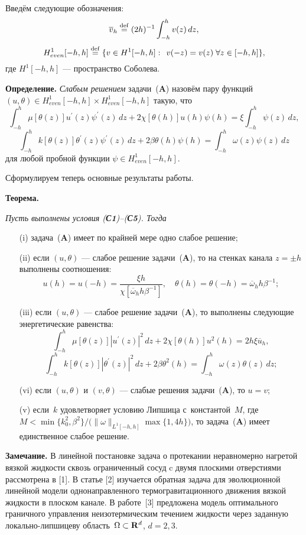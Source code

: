 Введём следующие обозначения:
$$
\overline{v}_h\stackrel{{\rm def}}{=}(2h)^{-1}\int_{-h}^hv(z)\,dz,
$$
$$
H^1_{ even}[-h,h]\stackrel{{\rm def}}{=}\{v\in H^1[-h,h]:\;\, v(-z)=v(z)\; \forall z\in [-h,h]\},
$$
где $H^1[-h,h]$ --- пространство Соболева.

\medskip
{\bf Определение.} {\it Слабым решением} задачи~({\bf A}) назовём пару функций ${(u, \theta)\in H^1_{even}[-h,h]\times H^1_{even}[-h,h]}$ такую, что
$$
\int_{-h}^h\mu[\theta(z)]u^\prime(z) \psi^\prime(z)\,dz
+2\chi[\theta(h)]u(h)\psi(h)
=\xi\int_{-h}^h \psi(z)\,dz,
$$
$$
\int_{-h}^hk[\theta(z)]\theta^\prime(z) \psi^\prime(z)\,dz
+2\beta\theta(h)\psi(h)
=\int_{-h}^h \omega(z)\psi(z)\,dz
$$
для любой пробной функции ${\psi\in H^1_{even}[-h,h]}$.
\medskip

Сформулируем теперь основные результаты работы.

\medskip
\textbf{Теорема.}
{\it
Пусть выполнены условия {\rm({\bf С1})}--{\rm({\bf С5})}. Тогда
\begin{itemize}
\item[{\rm (i)}] задача~{\rm({\bf A})} имеет по крайней мере одно слабое решение;
\item[{\rm (ii)}] если ${(u,\theta)}$ --- слабое решение задачи~{\rm({\bf A})}, то на стенках канала ${z=\pm h}$ выполнены соотношения:
$$
u(h)=u(-h)=\frac{\xi h}{\chi[\overline{\omega}_h h\beta^{-1}]},\quad \theta(h)=\theta(-h)=\overline{\omega}_h h\beta^{-1};
$$
\item[{\rm (iii)}]
если ${(u,\theta)}$ --- слабое решение задачи~{\rm({\bf A})}, то выполнены следующие энергетические равенства:
$$
\int_{-h}^h\mu[\theta(z)]|u^\prime(z)|^2\,dz
+2\chi[\theta(h)]u^2(h)
=2h\xi\overline{u}_h,
$$
$$
\int_{-h}^hk[\theta(z)]|\theta^\prime(z)|^2\,dz
+2\beta\theta^2(h)
=\int_{-h}^h\omega(z) \theta(z)\,dz;
$$
\item[{\rm (vi)}] если $(u,\theta)$ и $(v,\theta)$ --- слабые решения задачи~{\rm({\bf A})}, то ${u=v}$;
\item[{\rm (v)}] если~$k$ удовлетворяет условию Липшица
с~константой~$M$, где ${M<{\min\{k_0^2,\beta^2\}}/\big({\|\omega\|_{L^1[-h,h]}\max\{1,4h\}}\big)}$,
то задача~{\rm({\bf A})} имеет единственное слабое решение.
\end{itemize}
}

{\bf Замечание.} В линейной постановке задача о протекании неравномерно нагретой вязкой жидкости сквозь ограниченный сосуд c двумя плоскими отверстиями рассмотрена в [1]. В статье [2] изучается обратная задача для эволюционной линейной модели одно\-направленного термогравитационного движения вязкой жидкости в плоском канале. В работе~[3] предложена модель оптимального граничного управления неизотермическим течением жидкости через заданную локально-липшицеву область~${\Omega\subset{\bf R}^d}$, ${d=2,3}$.

